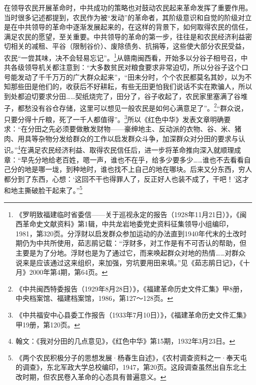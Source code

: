 在领导农民开展革命时，中共成功的策略也对鼓动农民起来革命发挥了重要作用。当时很多记述都提到，农民作为被“发动”的革命者，其阶级意识和自觉的阶级对立是在中共领导的革命中逐渐发展起来的，在这样的背景下，如何取得农民的信任，满足农民的愿望，至关重要。中共领导的革命的第一步，往往是和农民经济利益密切相关的减租、平谷（限制谷价）、废除债务、抗捐等，这些使大部分农民受益，农民“一尝其味，决不会轻易忘记”。\footnote{《罗明致福建临时省委信——关于巡视永定的报告（1928年11月21日）》，《闽西革命史文献资料》第1辑，中共龙岩地委党史资料征集领导小组编印，1981，第320页。分浮财以启发群众参加运动的办法直到1940年代末的土改时期仍为中共所使用，茹志鹃记载：“浮财多，对工作是有不可否认的帮助，但主要是为了分地。浮财也是为了通过它，而来唤起群众对地的热情……对群众说来是应该通过这来组织，来加强，穷坑要用田来填。”见《茹志鹃日记》，《十月》2000年第4期，第64页。}从赣南闽西看，开始多以分谷子相号召，中共各级领导机关都注意到：“大多数贫民对粮食要求非常迫切，所以分谷子这个口号能发动了千千万万的广大群众起来”，“田未分时，个个农民都莫名其妙，以为不知那些田是他们的，收获后不好耕耘，有些无田更怕我们说话不实在欺骗人，所以到处都迫切要求分田……契纸烧完了，田分了，谷子收起了，农民家里塞满了谷堆子，都愁没有谷仓存储，这里可以想见一般农民是如何心满意足了”。\footnote{《中共闽西特委报告（1929年8月28日）》，《福建革命历史文件汇集》甲8册，中央档案馆、福建档案馆，1986，第127～128页。}“群众说，只要分得十斤粮，死了一千人都值得”。\footnote{《中共福安中心县委工作报告（1933年7月10日）》，《福建革命历史文件汇集》甲19册，第120页。}所以《红色中华》发表文章明确要求：“在分田之先必须要做散发财物——豪绅地主、反动派的衣物、谷、米、猪肉、用具等杂物分发给群众的工作以启发群众斗争，加深群众对分田的要求与认识。”\footnote{翰文：《我对分田的几点意见》，《红色中华》第15期，1932年3月23日。}在满足农民经济利益、取得农民信任后，进一步将革命推向深入就顺理成章：“早先分地给老百姓，嗯一声，谁也不在乎，给多少要多少……谁也不去看看自己分的地是哪一垅，到种地时，谁也找不上自己的地在哪块。后来又分东西，穷人都分到了东西，心想：‘这回不干也得罪人了，反正好人也装不成了，干吧！’这才和地主撕破脸干起来了。”\footnote{《两个农民积极分子的思想发展·杨春生自述》，《农村调查资料之一·奉天屯的调查》，东北军政大学总校编印，1947，第20页。这段调查虽然出自东北土改时期，但农民卷入革命的心态具有普遍意义。}


